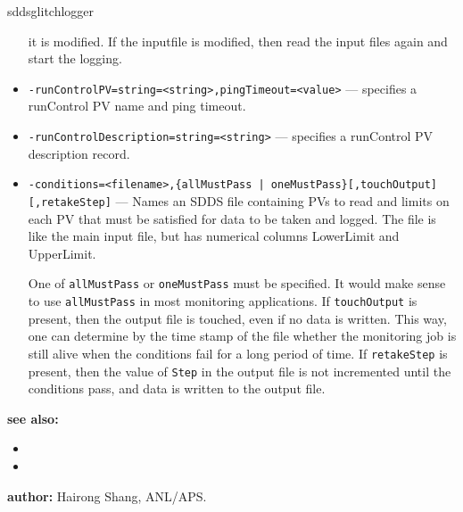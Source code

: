 \begin{sddsprog}{sddsglitchlogger}
\begin{itemize}
                it is modified. If the inputfile is modified, then read the input files again and start
                the logging.
  \item {\tt -runControlPV=string=<string>,pingTimeout=<value>} --- specifies a runControl PV name
                and ping timeout.
  \item {\tt -runControlDescription=string=<string>} --- specifies a runControl PV description record.
  \item {\verb+-conditions=<filename>,{allMustPass | oneMustPass}[,touchOutput][,retakeStep]+} ---
                   Names an SDDS file containing PVs to read and limits on each PV that must
                   be satisfied for data to be taken and logged.  The file is like the main
                   input file, but has numerical columns LowerLimit and UpperLimit.

                One of \verb+allMustPass+ or \verb+oneMustPass+ must be specified. It would make sense
                to use \verb+allMustPass+ in most monitoring applications.
                If \verb+touchOutput+ is present, then the output file is touched, even if no data
                is written. This way, one can determine by the time stamp of the file
                whether the monitoring job is still alive
                when the conditions fail for a long period of time. If \verb+retakeStep+ is
                present, then the value of \verb+Step+ in the output file is not
                incremented until the conditions pass, and data is written to the output file.
\end{itemize}

\item \textbf{see also:}
\begin{itemize}
  \item {}
  \item {}
\end{itemize}
\item \textbf{author:} Hairong Shang, ANL/APS.
\end{sddsprog}
